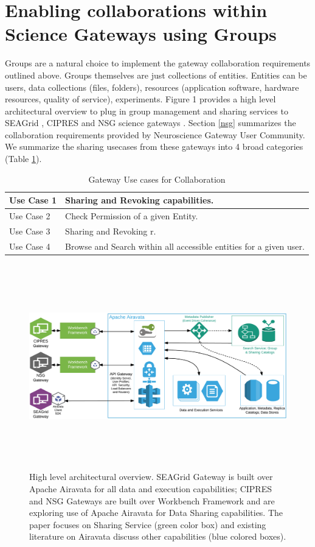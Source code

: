\documentclass[sigconf]{acmart}
\begin{document}
\section{Enabling collaborations within Science Gateways using Groups}

Groups are a natural choice to implement the gateway collaboration requirements outlined above. Groups themselves are just collections of entities. Entities can be  users, data collections (files, folders), resources (application software, hardware resources, quality of service), experiments. Figure 1 provides a high level architectural overview to plug in group management and sharing services to SEAGrid \cite{seagridCommunity2016}, CIPRES \cite{cipres2010} and NSG science gateways \cite{nsg2013}. Section \ref{nsg} summarizes the collaboration requirements provided by Neuroscience Gateway User Community. We summarize the sharing usecases from these gateways into 4 broad categories (Table \ref{table:usecases}). 

\begin{table}
\begin{tabular}{ |p{2cm}|p{6cm}| }
\hline
Use Case 1 & Sharing and Revoking capabilities.\\
\hline
Use Case 2 & Check Permission of a given Entity.\\
\hline
Use Case 3 & Sharing and Revoking r.\\
\hline
Use Case 4 & Browse and Search within all accessible entities for a given user.\\
\hline
\end{tabular}
\caption{Gateway Use cases for Collaboration}
\label{table:usecases}
\end{table}

\begin{figure}
\includegraphics[height=3.5in, width=7in]{figures/gateway-integaration-overview.pdf}
\caption{High level architectural overview. SEAGrid Gateway is built over Apache Airavata for all data and execution capabilities; CIPRES and NSG Gateways are built over Workbench Framework and are exploring use of Apache Airavata for Data Sharing capabilities. The paper focuses on Sharing Service (green color box) and existing literature on Airavata discuss other capabilities (blue colored boxes).}
\end{figure}
\end{document}
